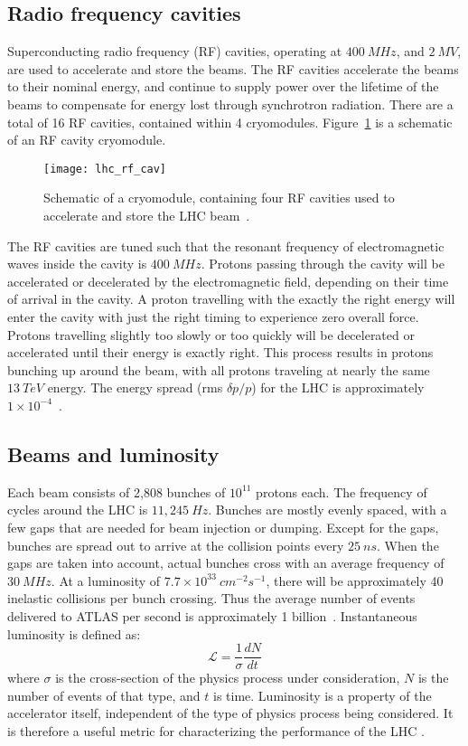 \subsection{Radio frequency cavities}\label{subsec:lhc_rf}

Superconducting radio frequency (RF) cavities, operating at $400~MHz$, and $2~MV$, are used to accelerate and store the beams.
The RF cavities accelerate the beams to their nominal energy,
and continue to supply power over the lifetime of the beams to compensate for energy lost through synchrotron radiation.
There are a total of 16 RF cavities, contained within 4 cryomodules.
Figure~\ref{fig:rf_cryo} is a schematic of an RF cavity cryomodule.

\begin{figure}[!ht]\centering
\texttt{[image: lhc\_rf\_cav]}
\caption{Schematic of a cryomodule, containing four RF cavities used to accelerate and store the LHC beam~\cite{lhc-machine-2008}.}
\label{fig:rf_cryo}
\end{figure}
The RF cavities are tuned such that the resonant frequency of electromagnetic waves inside the cavity is $400~MHz$.
Protons passing through the cavity will be accelerated or decelerated by the electromagnetic field,
depending on their time of arrival in the cavity.
A proton travelling with the exactly the right energy will enter the cavity with just the right timing to experience zero overall force.
Protons travelling slightly too slowly or too quickly will be decelerated or accelerated until their energy is exactly right.
This process results in protons bunching up around the beam, with all protons traveling at nearly the same $13~TeV$ energy.
The energy spread (rms $\delta p/p$) for the LHC is approximately $1\times 10^{-4}$~\cite{sm-pdg-dark-matter}.

\subsection{Beams and luminosity}\label{subsec:lhc_beam}

Each beam consists of 2,808 bunches of $10^{11}$ protons each.
The frequency of cycles around the LHC is $11,245~Hz$.
Bunches are mostly evenly spaced, with a few gaps that are needed for beam injection or dumping.
Except for the gaps, bunches are spread out to arrive at the collision points every $25~ns$.
When the gaps are taken into account, actual bunches cross with an average frequency of $30~MHz$.
At a luminosity of $7.7\times10^{33}~cm^{-2}s^{-1}$, there will be approximately 40 inelastic collisions per bunch crossing.
Thus the average number of events delivered to ATLAS per second is approximately 1 billion~\cite{lhc-guide-2017}.
Instantaneous luminosity is defined as:
\begin{equation}
\mathcal{L} = \frac{1}{\sigma}\frac{dN}{dt}
\end{equation}
where $\sigma$ is the cross-section of the physics process under consideration, $N$ is the number of events of that type, and $t$ is time.
Luminosity is a property of the accelerator itself, independent of the type of physics process being considered.
It is therefore a useful metric for characterizing the performance of the LHC .

